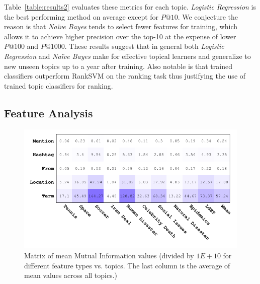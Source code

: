 \documentclass[letterpaper]{article}
\begin{document}
Table~\ref{table:results2} evaluates these metrics for each
topic. \textit{Logistic Regression} is the best performing
method on average except for $P@10$.  We conjecture the reason
is that \textit{Na\"{i}ve Bayes} tends to select fewer
features for training, which allows it to achieve higher precision
over the top-10 at the expense of lower $P@100$ and $P@1000$.
These results suggest that in general both \textit{Logistic Regression} 
and \textit{Na\"{i}ve Bayes} make for effective topical 
learners %
and generalize to new unseen topics up to a year after training.
Also notable is that 
trained classifiers outperform RankSVM on the ranking task thus justifying
the use of trained topic classifiers for ranking.


\subsection{Feature Analysis}
\label{label:featureanalysis}
\begin{figure}[t!]
\centering
\includegraphics[width=\columnwidth]{images/avgMI_gray2.pdf}
\caption{Matrix of mean Mutual Information values (divided by $1E+10$ for different feature types vs. topics.  The last column is the average of mean values across all topics.)}
\label{fig:avgMI}
\end{figure}
\end{document}

